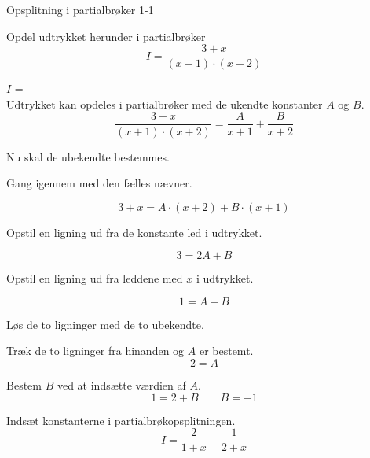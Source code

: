 \documentclass{article}
\begin{document}
\tableofcontents

\begin{exercise}{Opsplitning i partialbrøker 1-1}

Opdel udtrykket herunder i partialbrøker
\[
I = \frac{3 + x}{(x + 1) \cdot (x + 2)}
\]

$I$ =  \\

\hint
Udtrykket kan opdeles i partialbrøker med de ukendte konstanter $A$ og $B$.
\[
\frac{3 + x}{(x + 1) \cdot (x + 2)} = 
\frac{A}{x + 1} + \frac{B}{x + 2}
\]

\hint
Nu skal de ubekendte bestemmes.

\hint
Gang igennem med den fælles nævner.

\hint
\[
3 + x = A \cdot (x + 2) + B \cdot (x + 1)
\]

\hint
Opstil en ligning ud fra de konstante led i udtrykket.

\hint
\[
3 = 2A+B
\]

\hint
Opstil en ligning ud fra leddene med $x$ i udtrykket.

\hint
\[
1 = A + B
\]

\hint
Løs de to ligninger med de to ubekendte.

\hint
Træk de to ligninger fra hinanden og $A$ er bestemt.
\[
2 = A
\]

\hint
Bestem $B$ ved at indsætte værdien af $A$.
\[
1 = 2 + B \qquad B = -1
\]

\hint
Indsæt konstanterne i partialbrøkopsplitningen.
\[
I = \frac{2}{1 + x} - \frac{1}{2+x}
\]



\end{exercise}
\end{document}
